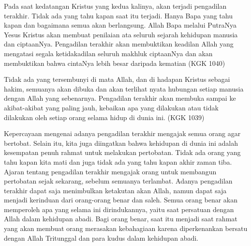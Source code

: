 Pada saat kedatangan Kristus yang kedua kalinya, akan terjadi pengadilan terakhir. Tidak ada yang tahu kapan saat itu terjadi. Hanya Bapa yang tahu kapan dan bagaimana semua akan berlangsung. Allah Bapa melalui PutraNya Yesus Kristus akan membuat penilaian ata seluruh sejarah kehidupan manusia dan ciptaanNya. Pengadilan terakhir akan membuktikan keadilan Allah yang mengatasi segala ketidakadilan seluruh makhluk ciptaanNya dan akan membuktikan bahwa cintaNya lebih besar daripada kematian (KGK 1040)

Tidak ada yang tersembunyi di mata Allah, dan di hadapan Kristus sebagai hakim, semuanya akan dibuka dan akan terlihat nyata hubungan setiap manusia dengan Allah yang sebenarnya. Pengadilan terakhir akan membuka sampai ke akibat-akibat yang paling jauh, kebaikan apa yang dilakukan atau tidak dilakukan oleh setiap orang selama hidup di dunia ini. (KGK 1039)

Kepercayaan mengenai adanya pengadilan terakhir mengajak semua orang agar bertobat. Selain itu, kita juga diingatkan bahwa kehidupan di dunia ini adalah kesempatan penuh rahmat untuk melakukan pertobatan. Tidak ada orang yang tahu kapan kita mati dan juga tidak ada yang tahu kapan akhir zaman tiba. Ajaran tentang pengadilan terakhir mengajak orang untuk membangun pertobatan sejak sekarang, sebelum semuanya terlambat. Adanya pengadilan terakhir dapat saja menimbulkan ketakutan akan Allah, namun dapat saja menjadi kerinduan dari orang-orang benar dan saleh. Semua orang benar akan memperoleh apa yang selama ini dirindukannya, yaitu saat persatuan dengan Allah dalam kehidupan abadi. Bagi orang benar, saat itu menjadi saat rahmat yang akan membuat orang merasakan kebahagiaan karena diperkenankan bersatu dengan Allah Tritunggal dan para kudus dalam kehidupan abadi.
